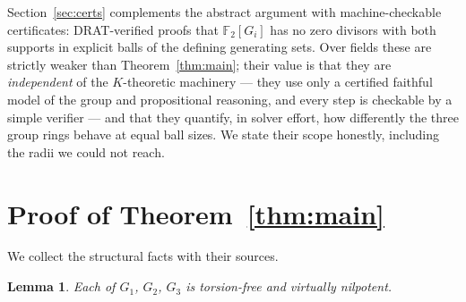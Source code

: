 \documentclass[10pt,a4paper]{amsart}
\newtheorem{lemma}[theorem]{Lemma}
\newcommand{\GOne}{G_1}
\newcommand{\GTwo}{G_2}
\newcommand{\GThree}{G_3}
\newcommand{\F}{\mathbb{F}}
\begin{document}
Section~\ref{sec:certs} complements the abstract argument with
machine-checkable certificates: DRAT-verified proofs that $\F_2[G_i]$ has
no zero divisors with both supports in explicit balls of the defining
generating sets. Over fields these are strictly weaker than
Theorem~\ref{thm:main}; their value is that they are \emph{independent} of
the $K$-theoretic machinery --- they use only a certified faithful model of
the group and propositional reasoning, and every step is checkable by a
simple verifier --- and that they quantify, in solver effort, how
differently the three group rings behave at equal ball sizes. We state
their scope honestly, including the radii we could not reach.

\section{Proof of Theorem~\ref{thm:main}}\label{sec:proof}

We collect the structural facts with their sources.

\begin{lemma}\label{lem:vn}
Each of $\GOne$, $\GTwo$, $\GThree$ is torsion-free and virtually
nilpotent.
\end{lemma}
\end{document}
